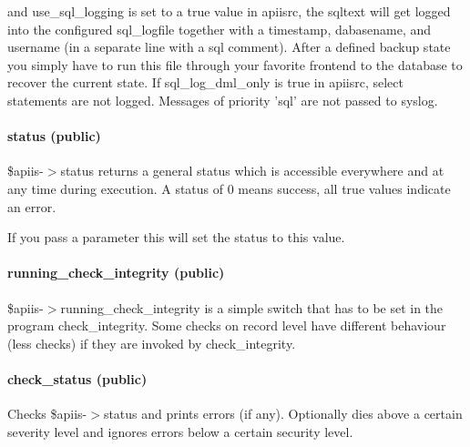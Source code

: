 and use\_sql\_logging is set to a true value in apiisrc, the sqltext will get
logged into the configured sql\_logfile together with a timestamp,
dabasename, and username (in a separate line with a sql comment). After a
defined backup state you simply have to run this file through your favorite
frontend to the database to recover the current state. If sql\_log\_dml\_only
is true in apiisrc, select statements are not logged.
Messages of priority 'sql' are not passed to syslog.

\paragraph*{status (public)\label{Apiis::Init_--_Basic_initialisation_object_for_the_complete_APIIS_structure_status_public_}}


\$apiis-$>$status returns a general status which is accessible everywhere and
at any time during execution. A status of 0 means success, all true values
indicate an error.



If you pass a parameter this will set the status to this value.

\paragraph*{running\_check\_integrity (public)\label{Apiis::Init_--_Basic_initialisation_object_for_the_complete_APIIS_structure_running_check_integrity_public_}}


\$apiis-$>$running\_check\_integrity is a simple switch that has to be set in
the program check\_integrity. Some checks on record level have different
behaviour (less checks) if they are invoked by check\_integrity.

\paragraph*{check\_status (public)\label{Apiis::Init_--_Basic_initialisation_object_for_the_complete_APIIS_structure_check_status_public_}}


Checks \$apiis-$>$status and prints errors (if any). Optionally dies above a
certain severity level and ignores errors below a certain security level.



